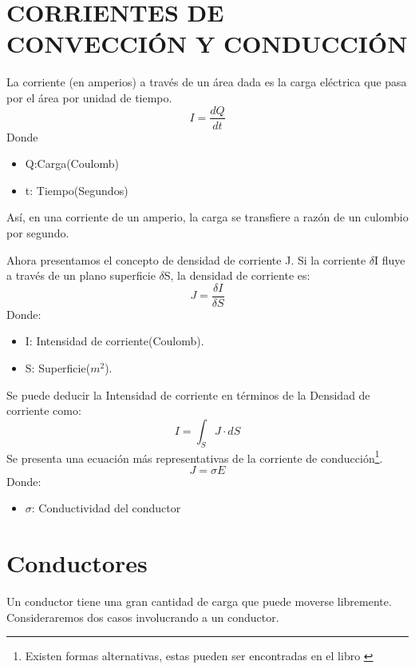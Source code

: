 \documentclass[
	11pt, %
	fleqn, %
	a4paper, %
]{LegrandOrangeBook}
\begin{document}
\section{CORRIENTES DE CONVECCIÓN Y CONDUCCIÓN}
\begin{definition}[Corriente]
La corriente (en amperios) a través de un área dada es la carga eléctrica que pasa por el área por unidad de tiempo.\\
\begin{equation}
\label{eq:corriente}
I=\frac{dQ}{dt}
\end{equation}
Donde\\
\begin{itemize}
\item Q:Carga(Coulomb)
\item t: Tiempo(Segundos)
\end{itemize}
Así, en una corriente de un amperio, la carga se transfiere a razón de un culombio por segundo.
\end{definition}
\begin{definition}
Ahora presentamos el concepto de densidad de corriente J. Si la corriente $\delta$I fluye a través de un plano superficie $\delta$S, la densidad de corriente es:
\begin{equation}
\label{eq: densidad de corriente}
J=\frac{\delta I}{\delta S}
\end{equation}
Donde:
\begin{itemize}
\item I: Intensidad de corriente(Coulomb).
\item S: Superficie($m^2$).
\end{itemize}
\end{definition}
Se puede deducir la Intensidad de corriente en términos de la Densidad de corriente como:
\begin{equation}
\label{eq:intensidad y densidad de corriente}
I=\int_SJ\cdot dS
\end{equation}
Se presenta una ecuación más representativas de la corriente de conducción\footnote{Existen formas alternativas, estas pueden ser encontradas en el libro \cite{sadiku2018elements}}.
\begin{equation}\label{eq:JsigmaE}
J=\sigma E
\end{equation}
Donde:
\begin{itemize}
\item $\sigma$: Conductividad del conductor
\end{itemize}
\section{Conductores}
Un conductor tiene una gran cantidad de carga que puede moverse libremente. Consideraremos dos casos involucrando a un conductor.
\end{document}

